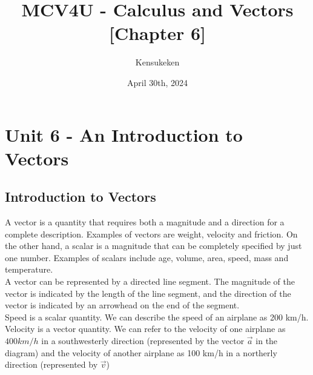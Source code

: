 \documentclass{article}
\title{MCV4U - Calculus and Vectors [Chapter 6]}
\author{Kensukeken}
\date{April 30th, 2024}
\begin{document}
\maketitle

\tableofcontents
\newpage
\section{Unit 6 - An Introduction to Vectors}
\subsection{Introduction to Vectors}
A vector is a quantity that requires both a magnitude and a direction for a complete description.  Examples of vectors are weight, velocity and friction.  On the other hand, a scalar is a magnitude that can be completely specified by just one number.  Examples of scalars include age, volume, area, speed, mass and temperature.\\


A vector can be represented by a directed line segment.  The magnitude of the vector is indicated by the length of the line segment, and the direction of the vector is indicated by an arrowhead on the end of the segment.\\


Speed is a scalar quantity. We can describe the speed of an airplane as 200 km/h.\\


Velocity is a vector quantity. We can refer to the velocity of one airplane as $400 km/h$ in a southwesterly direction (represented by the vector $\vec{a}$ in the diagram) and the velocity of another airplane as 100 km/h in a northerly direction (represented by $\Vec{v}$)\\
\begin{center}
    
\end{center}
\end{document}
